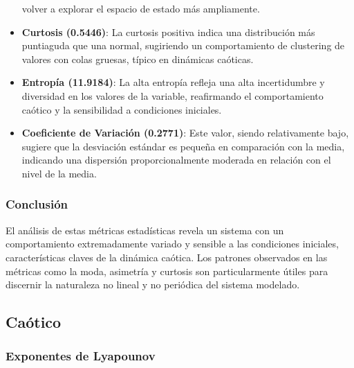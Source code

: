 \documentclass[11pt]{article}
\begin{document}
\begin{itemize}
  volver a explorar el espacio de estado más ampliamente.
\item
  \textbf{Curtosis (0.5446)}: La curtosis positiva indica una
  distribución más puntiaguda que una normal, sugiriendo un
  comportamiento de clustering de valores con colas gruesas, típico en
  dinámicas caóticas.
\item
  \textbf{Entropía (11.9184)}: La alta entropía refleja una alta
  incertidumbre y diversidad en los valores de la variable, reafirmando
  el comportamiento caótico y la sensibilidad a condiciones iniciales.
\item
  \textbf{Coeficiente de Variación (0.2771)}: Este valor, siendo
  relativamente bajo, sugiere que la desviación estándar es pequeña en
  comparación con la media, indicando una dispersión proporcionalmente
  moderada en relación con el nivel de la media.
\end{itemize}

\hypertarget{conclusiuxf3n}{%
\subsubsection{Conclusión}\label{conclusiuxf3n}}

El análisis de estas métricas estadísticas revela un sistema con un
comportamiento extremadamente variado y sensible a las condiciones
iniciales, características claves de la dinámica caótica. Los patrones
observados en las métricas como la moda, asimetría y curtosis son
particularmente útiles para discernir la naturaleza no lineal y no
periódica del sistema modelado.

    \hypertarget{cauxf3tico}{%
\subsection{Caótico}\label{cauxf3tico}}

    \hypertarget{exponentes-de-lyapounov}{%
\subsubsection{Exponentes de Lyapounov}\label{exponentes-de-lyapounov}}
\end{document}
